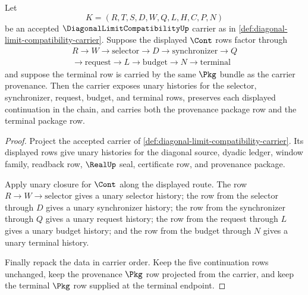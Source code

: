 \begin{theorem}
\label{thm:diagonal-limit-compatibility-carrier-finite-observation-budget-factorization}
Let
$$
K=(R,T,S,D,W,Q,L,H,C,P,N)
$$
be an accepted $\DiagonalLimitCompatibilityUp$ carrier as in
\autoref{def:diagonal-limit-compatibility-carrier}. Suppose the displayed
$\Cont$ rows factor through
$$
\begin{gathered}
R \to W \to \text{selector} \to D \to \text{synchronizer} \to Q\\
\to \text{request} \to L \to \text{budget} \to N \to \text{terminal}
\end{gathered}
$$
and suppose the terminal row is carried by the same $\Pkg$ bundle as the
carrier provenance. Then the carrier exposes unary histories for the selector,
synchronizer, request, budget, and terminal rows, preserves each displayed
continuation in the chain, and carries both the provenance package row and the
terminal package row.
\end{theorem}
\begin{proof}
Project the accepted carrier of
\autoref{def:diagonal-limit-compatibility-carrier}. Its displayed rows give
unary histories for the diagonal source, dyadic ledger, window family,
readback row, $\RealUp$ seal, certificate row, and provenance package.

Apply unary closure for $\Cont$ along the displayed route. The row
$R \to W \to \text{selector}$ gives a unary selector history; the row from the
selector through $D$ gives a unary synchronizer history; the row from the
synchronizer through $Q$ gives a unary request history; the row from the
request through $L$ gives a unary budget history; and the row from the budget
through $N$ gives a unary terminal history.

Finally repack the data in carrier order. Keep the five continuation rows
unchanged, keep the provenance $\Pkg$ row projected from the carrier, and keep
the terminal $\Pkg$ row supplied at the terminal endpoint.
\end{proof}

